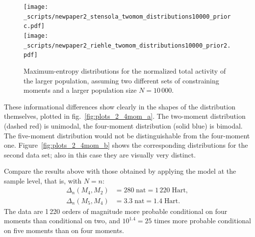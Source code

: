 \documentclass[\ifafour a4paper,12pt,\else a5paper,10pt,\fi%
onecolumn,oneside,article,%
british%
]{memoir}
\theoremstyle{remark}
\theoremstyle{innote}
\renewcommand*{\|}{\nonscript\,\vert\nonscript\;\mathopen{}}
\newcommand*{\fig}{fig.}%
\newcommand*{\ydi}{\varDelta}
\newcommand*{\nat}{\textrm{nat}}
\newcommand*{\hart}{\textrm{Hart}}
\begin{document}
\begin{figure}[!p]
\centering
\subcaption[]{\label{fig:plots_2_4mom_a}}%
\texttt{[image: \_scripts/newpaper2\_stensola\_twomom\_distributions10000\_priorc.pdf]}%
\\[2em]%
\subcaption[]{\label{fig:plots_2_4mom_b}}%
\texttt{[image: \_scripts/newpaper2\_riehle\_twomom\_distributions10000\_prior2.pdf]}%
\\[2em]%
\caption{Maximum-entropy distributions for the normalized total activity of
  the larger population, assuming two different sets of constraining moments
  and a larger population size $N=10\,000$.}
\label{fig:plots_2_4mom}
\end{figure}
These informational differences show clearly in the shapes of the
distribution themselves, plotted in 
\fig~\ref{fig:plots_2_4mom_a}. The two-moment distribution
(\textcolor{myred}{dashed red}) is unimodal, the four-moment distribution
(\textcolor{myblue}{solid blue}) is bimodal. The five-moment distribution
would not be distinguishable from the four-moment one.  Figure~\ref{fig:plots_2_4mom_b} shows the corresponding distributions for the second data set;
also in this case they are visually very distinct.

\medskip

Compare the results above with those obtained by applying the model at the
sample level, that is, with $N=n$:
\begin{equation}
  \label{eq:diff_suff_n}
  \begin{split}
  \ydi_{n}(M_{4},M_{2}) &= 280\;\nat = 1\,220\;\hart,
\\    \ydi_{n}(M_{5},M_{4}) &= 3.3\;\nat = 1.4\;\hart.
\end{split}
\end{equation}
The data are 1\,220 orders of magnitude more probable conditional on four
moments than conditional on two, and $10^{1.4}=25$ times more probable
conditional on five moments than on four moments.
\end{document}
